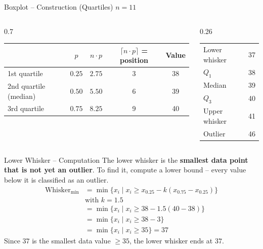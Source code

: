 \documentclass[aspectratio=169,11pt]{beamer}
\begin{document}
\begin{frame}{Boxplot -- Construction (Quartiles)}
  $n = 11$

  \vspace{0.5cm}

  \begin{columns}[T]
  \begin{column}{0.7\textwidth}
  \begin{center}
    \small\renewcommand{\arraystretch}{1.1}
    \begin{tabular}{lcccc}
      \toprule
      & $p$ & $n \cdot p$ & $\lceil n \cdot p \rceil$ = position & Value \\
      \midrule
      1st quartile & $0.25$ & $2.75$ & 3 & 38 \\
      2nd quartile (median) & $0.50$ & $5.50$ & 6 & 39 \\
      3rd quartile & $0.75$ & $8.25$ & 9 & 40 \\
      \bottomrule
    \end{tabular}
  \end{center}
  \end{column}
  \begin{column}{0.26\textwidth}
  \begin{center}
    \renewcommand{\arraystretch}{1.1}
    \begin{tabular}{lr}
      \toprule
      Lower whisker & 37 \\
      $Q_1$ & 38 \\
      Median & 39 \\
      $Q_3$ & 40 \\
      Upper whisker & 41 \\
      Outlier & 46 \\
      \bottomrule
    \end{tabular}
  \end{center}
  \end{column}
  \end{columns}
\end{frame}

\begin{frame}{Lower Whisker -- Computation}
  The lower whisker is the \textbf{smallest data point that is not yet an outlier}.
  To find it, compute a lower bound -- every value below it is classified as an outlier.
  \begin{align*}
    \text{Whisker}_{\min} &= \min\{x_i \mid x_i \ge x_{0.25} - k(x_{0.75} - x_{0.25})\} \\
    &\text{with } k = 1.5 \\
    &= \min\{x_i \mid x_i \ge 38 - 1.5(40 - 38)\} \\
    &= \min\{x_i \mid x_i \ge 38 - 3\} \\
    &= \min\{x_i \mid x_i \ge 35\} = 37
  \end{align*}
  Since $37$ is the smallest data value $\ge 35$, the lower whisker ends at $37$.
\end{frame}
\end{document}

